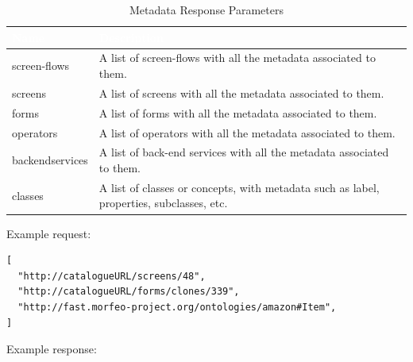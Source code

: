 \documentclass{fast_latex}
\begin{document}
\begin{table}[htb]
\caption{Metadata Response Parameters}
\label{tab:metadata_response}
\begin{center}
\begin{tabular}{|p{2.5cm}|p{11.5cm}|}
\hline
\rowcolor{fast@lightgrey}\textcolor{white}{Name} &
                         \textcolor{white}{Description}\\ \hline
screen-flows & A list of screen-flows with all the metadata associated to them.\\ \hline
screens & A list of screens with all the metadata associated to them.\\ \hline
forms & A list of forms with all the metadata associated to them.\\ \hline
operators & A list of operators with all the metadata associated to them.\\ \hline
backendservices & A list of back-end services with all the metadata associated to them.\\ \hline
classes & A list of classes or concepts, with metadata such as label, properties, subclasses, etc.\\ \hline
\end{tabular}
\end{center}
\end{table}

Example request:

\singlespacing
\begin{verbatim}
[
  "http://catalogueURL/screens/48",
  "http://catalogueURL/forms/clones/339",
  "http://fast.morfeo-project.org/ontologies/amazon#Item",
]
\end{verbatim}
\doublespacing

Example response:
\end{document}
